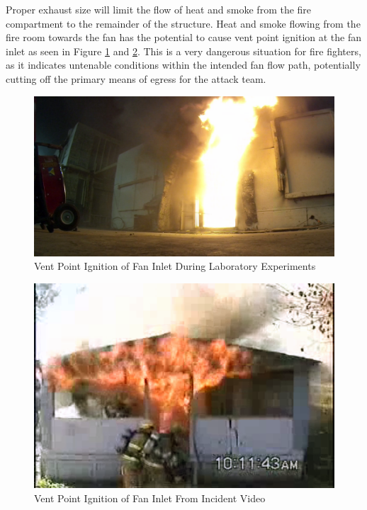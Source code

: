 \documentclass{article}
\begin{document}
Proper exhaust size will limit the flow of heat and smoke from the fire compartment to the remainder of the structure. Heat and smoke flowing from the fire room towards the fan has the potential to cause vent point ignition at the fan inlet as seen in Figure \ref{fig:VentPointIgnitionLab} and \ref{fig:VentPointIgnitionField}. This is a very dangerous situation for fire fighters, as it indicates untenable conditions within the intended fan flow path, potentially cutting off the primary means of egress for the attack team.

\begin{figure}[H]
	\centering
	\includegraphics[width = 5in]{0_Images/Tactical_Considerations/PPA_Exhaust_Dependant/Vent_Point_Ignition.png}
	\caption{Vent Point Ignition of Fan Inlet During Laboratory Experiments}
	\label{fig:VentPointIgnitionLab}
\end{figure}

\begin{figure}[H]
	\centering
	\includegraphics[width = 5in]{0_Images/Tactical_Considerations/PPA_Exhaust_Dependant/Vent_Point_Ignition_Field.png}
	\caption{Vent Point Ignition of Fan Inlet From Incident Video}
	\label{fig:VentPointIgnitionField}
\end{figure}
\end{document}
